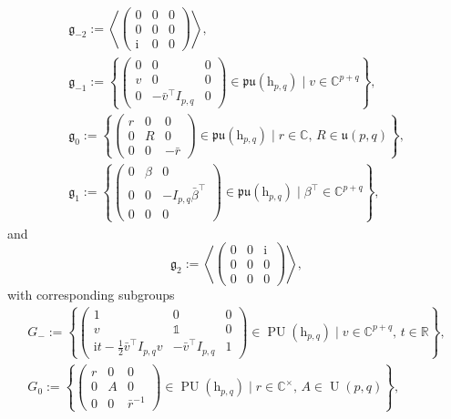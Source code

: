 \documentclass[pdftex]{sigma}
\numberwithin{equation}{section}
\theoremstyle{definition}
\DeclareMathOperator{\Utry}{\mathrm{U}}
\DeclareMathOperator{\PU}{\mathrm{PU}}
\begin{document}
\begin{gather*}
\mathfrak{g}_{-2}:=\left\langle\begin{pmatrix}0 & 0 & 0 \\ 0 & 0 & 0 \\ \mathrm{i} & 0 & 0\end{pmatrix}\right\rangle,\\
 \mathfrak{g}_{-1}:=\left\{\begin{pmatrix}0 & 0 & 0 \\ v & 0 & 0 \\ 0 & -\bar{v}^\top I_{p,q} & 0\end{pmatrix}\in\mathfrak{pu}(\mathrm{h}_{p,q})\mid v\in\mathbb{C}^{p+q}\right\},\\
 \mathfrak{g}_0:=\left\{\begin{pmatrix}r & 0 & 0 \\ 0 & R & 0 \\ 0 & 0 & -\bar{r}\end{pmatrix}\in\mathfrak{pu}(\mathrm{h}_{p,q})\mid r\in\mathbb{C},\, R\in\mathfrak{u}(p,q)\right\},\\
 \mathfrak{g}_1:=\left\{\begin{pmatrix}0 & \beta & 0 \\ 0 & 0 & -I_{p,q}\bar{\beta}^\top \\ 0 & 0 & 0\end{pmatrix}\in\mathfrak{pu}(\mathrm{h}_{p,q}) \mid \beta^\top\in\mathbb{C}^{p+q}\right\},
\end{gather*}
and
\[\mathfrak{g}_2:=\left\langle\begin{pmatrix}0 & 0 & \mathrm{i} \\ 0 & 0 & 0 \\ 0 & 0 & 0\end{pmatrix}\right\rangle,\]
with corresponding subgroups
\begin{gather*}
G_-:=\left\{\begin{pmatrix}1 & 0 & 0 \\ v & \mathds{1} & 0 \\ \mathrm{i}t-\tfrac{1}{2}\bar{v}^\top I_{p,q} v & -\bar{v}^\top I_{p,q} & 1\end{pmatrix}\in\PU(\mathrm{h}_{p,q})\mid v\in\mathbb{C}^{p+q},\, t\in\mathbb{R}\right\},\\
 G_0:=\left\{\begin{pmatrix}r & 0 & 0 \\ 0 & A & 0 \\ 0 & 0 & \bar{r}^{-1}\end{pmatrix}\in\PU(\mathrm{h}_{p,q})\mid r\in\mathbb{C}^\times,\, A\in\Utry(p,q)\right\},
 \end{gather*}
\end{document}
